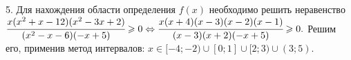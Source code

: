 5. Для нахождения области определения $f(x)$ необходимо решить неравенство\\ $\cfrac{x(x^2+x-12)(x^2-3x+2)}{(x^2-x-6)(-x+5)}\geqslant0
\Leftrightarrow \cfrac{x(x+4)(x-3)(x-2)(x-1)}{(x-3)(x+2)(-x+5)}\geqslant0.$ Решим его, применив метод интервалов:
$x\in[-4;-2)\cup[0;1]\cup[2;3)\cup(3;5).$
\begin{figure}[ht!]
\end{figure}\\
